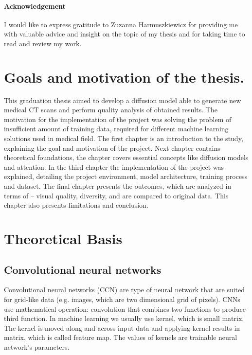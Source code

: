 \documentclass[11pt,a4paper]{report}
\begin{document}
\subsubsection{Acknowledgement}
I would like to express gratitude to Zuzanna Harmuszkiewicz for providing me with valuable advice and insight on the topic of my thesis and for taking time to read and review my work.
\newpage
\tableofcontents
\chapter{Goals and motivation of the thesis.}
This graduation thesis aimed to develop a diffusion model able to generate new medical CT scans and perform quality analysis of obtained results. The motivation for the implementation of the project was solving the problem of insufficient amount of training data, required for different machine learning solutions used in medical field. 
The first chapter is an introduction to the study, explaining the goal and motivation of the project. 
Next chapter contains theoretical foundations, the chapter covers essential concepts like diffusion models and attention. 
In the third chapter the implementation of the project was explained, detailing the project environment, model architecture, training process and dataset.
The final chapter presents the outcomes, which are analyzed in terms of – visual quality, diversity, and are compared to original data. This chapter also presents limitations and conclusion.

\chapter{Theoretical Basis}

\section{Convolutional neural networks}
Convolutional neural networks (CCN) are type of neural network that are suited for grid-like data (e.g. images, which are two dimensional grid of pixels). CNNs use mathematical operation: convolution that combines two functions to produce third function. In machine learning we usually use kernel, which is small matrix. The kernel is moved along and across input data and applying kernel results in matrix, which is called feature map. The values of kernels are trainable neural network's parameters.
\cite{convolution} \cite{Michal}
\end{document}
